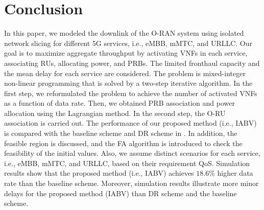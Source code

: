 \documentclass[lettersize,journal]{IEEEtran}
\begin{document}
\section{Conclusion}\label{conc}
In this paper, we modeled the downlink of the O-RAN system using isolated network slicing for different 5G services, i.e., eMBB, mMTC, and URLLC.
Our goal is to maximize aggregate throughput by activating VNFs in each service, associating RUs, allocating power, and PRBs. The limited fronthaul capacity and the mean delay for each service are considered.
The problem is mixed-integer non-linear programming that is solved by a two-step iterative algorithm.
In the first step, we reformulated the problem to achieve the number of activated VNFs as a function of data rate. Then, we obtained PRB association and power allocation using the Lagrangian method.
In the second step, the O-RU association is carried out.
The performance of our proposed method (i.e., IABV) is compared with the baseline scheme and DR scheme in \cite{lee2018dynamic}.
In addition, the feasible region is discussed, and the FA algorithm is introduced to check the feasibility of the initial values.
Also, we assume distinct scenarios for each service, i.e., eMBB, mMTC, and URLLC, based on their requirement QoS.
Simulation results show that the proposed method (i.e., IABV) achieves $18.6\%$ higher data rate than the baseline scheme.
Moreover, simulation results illustrate more minor delays for the proposed method (IABV) than DR scheme and the baseline scheme.
\vspace*{-1.1em}


\vspace*{-3em}
%
\end{document}
